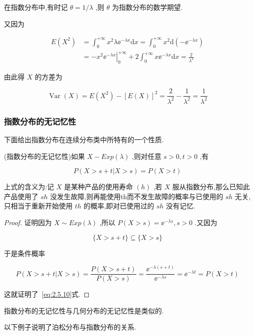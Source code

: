 在指数分布中,有时记 $ \theta=1 / \lambda $ ,则 $ \theta $ 为指数分布的数学期望.

又因为

\[
\begin{aligned} E\left(X^{2}\right) &=\int_{0}^{+\infty} x^{2} \lambda \ee ^{-\lambda x} \mathrm{d} x=\int_{0}^{+\infty} x^{2} \mathrm{d}\left(-\ee ^{-\lambda x}\right) \\ &=-x^{2}\left.\ee ^{-\lambda x}\right|_{0} ^{+\infty}+2 \int_{0}^{+\infty} x \ee ^{-\lambda x} \mathrm{d} x=\frac{2}{\lambda^{2}} \end{aligned}
\]

由此得 $ X $ 的方差为

\[
\operatorname{Var}(X)=E\left(X^{2}\right)-[E(X)]^{2}=\frac{2}{\lambda^{2}}-\frac{1}{\lambda^{2}}=\frac{1}{\lambda^{2}}
\]

\subsubsection{指数分布的无记忆性}

下面给出指数分布在连续分布类中所特有的一个性质.

\begin{theorem}
	(指数分布的无记忆性)如果 $ X-E x p(\lambda) $ ,则对任意 $ s>0,t>0 $ ,有
	
	\begin{equation}
	P(X>s+t | X>s)=P(X>t) \label{eq:2.5.10}
	\end{equation}
\end{theorem}

上式的含义为:记 $ X $ 是某种产品的使用寿命 $ (h) $ ,若 $ X $ 服从指数分布,那么已知此产品使用了 $ sh $ 没发生故障,则再能使用th而不发生故障的概率与已使用的 $ sh $ 无关,只相当于重新开始使用 $ th $ 的概率,即对已使用过的 $ sh $ 没有记忆.

\begin{proof}
	证明因为 $ X \sim E x p(\lambda) $ ,所以 $ P(X>s)=\ee ^{-\lambda s}, s>0 $ .又因为
	
	\[
	\{X>s+t\} \subseteq\{X>s\}
	\]
	
	于是条件概率
	
	\[
	P(X>s+t | X>s)=\frac{P(X>s+t)}{P(X>s)}=\frac{\ee ^{-\lambda(s+t)}}{\ee ^{-\lambda s}}=\ee ^{-\lambda t}=P(X>t)
	\]
	
	这就证明了~\ref{eq:2.5.10}式.
\end{proof}

指数分布的无记忆性与几何分布的无记忆性是类似的.

以下例子说明了泊松分布与指数分布的关系.

